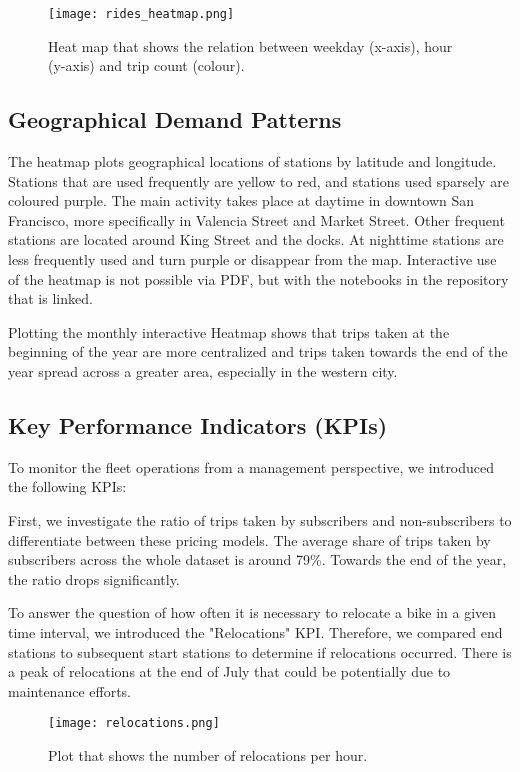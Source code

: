 \begin{figure}[hbtp]
    \centering
    \texttt{[image: rides\_heatmap.png]}
    \caption{Heat map that shows the relation between weekday (x-axis), hour (y-axis) and trip count (colour).}
\end{figure}


\subsection{Geographical Demand Patterns}

The heatmap plots geographical locations of stations by latitude and longitude. Stations that are used frequently are yellow to red, and stations used sparsely are coloured purple. The main activity takes place at daytime in downtown San Francisco, more specifically in Valencia Street and Market Street. Other frequent stations are located around King Street and the docks. At nighttime stations are less frequently used and turn purple or disappear from the map. Interactive use of the heatmap is not possible via PDF, but with the notebooks in the repository that is linked. 

Plotting the monthly interactive Heatmap shows that trips taken at the beginning of the year are more centralized and trips taken towards the end of the year spread across a greater area, especially in the western city.

\subsection{Key Performance Indicators (KPIs)}

To monitor the fleet operations from a management perspective, we introduced the following KPIs:

First, we investigate the ratio of trips taken by subscribers and non-subscribers to differentiate between these pricing models. The average share of trips taken by subscribers across the whole dataset is around 79\%. Towards the end of the year, the ratio drops significantly. 

To answer the question of how often it is necessary to relocate a bike in a given time interval, we introduced the "Relocations" KPI. Therefore, we compared end stations to subsequent start stations to determine if relocations occurred. There is a peak of relocations at the end of July that could be potentially due to maintenance efforts.

\begin{figure}[hbtp]
    \centering
    \texttt{[image: relocations.png]}
    \caption{Plot that shows the number of relocations per hour.}
\end{figure}



